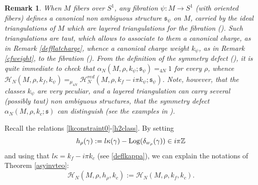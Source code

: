 \documentclass[11pt]{amsart}
\newtheorem{remark}[teo]{Remark}
\newcommand{\mz}{\mathbb{Z}}
\newcommand{\Log}{{\rm Log}}
\newcommand{\Hh}{{\mathcal H}}
\newcommand{\ra}{\rightarrow}
\begin{document}
{\begin{remark}\label{NAdefectmars25} {\rm When $M$ fibers over $S^1$, {\it any} fibration $\psi\colon M\ra S^1$ (with oriented fibers) defines a canonical non ambiguous structure $\mathfrak{s}_\psi$ on $M$, carried by the ideal triangulations of $M$ which are layered triangulations for the fibration (\cite[Prop. 6.3(1)]{NA}). Such triangulations are taut, which allows to associate to them a canonical charge, as in Remark \ref{defflatcharge}, whence a canonical charge weight $k_\psi$, as in Remark \ref{cfweight}, to the fibration (\cite[Prop. 4.3(2) and 4.8(2)]{NA}).  From the definition of the symmetry defect (\cite[page 808]{NA}), it is quite immediate to check that $\alpha_N(M,\rho,k_\psi;\mathfrak{s}_\psi)=_{4N} 1$ for every $\rho$, whence $\Hh_N(M,\rho,k_f,k_\psi) =_{\mu_{4N}} \Hh_N^{red}(M,\rho,k_f-i\pi k_\psi;\mathfrak{s}_\psi)$. Note, however, that the classes $k_\psi$ are very peculiar, and a layered triangulation can carry several (possibly taut) non ambiguous structures, that the symmetry defect $\alpha_N(M,\rho,k_c;\mathfrak{s})$ can distinguish (see the examples in \cite[Section 9]{NA}).} 
\end{remark}

Recall the relations \eqref{lkconstraint0}-\eqref{h2class}. By setting 
\begin{equation}\label{dconstraintclass} h_\rho(\gamma) := l\kappa(\gamma)-\Log(\delta_{w_\rho}(\gamma)) \in i\pi\mz
\end{equation}
and using that $l\kappa = k_f-i\pi k_c$ (see \eqref{deflkappa}), we can explain the notations of Theorem \ref{asyinvteo}:
\begin{equation}\label{HNdefh}
	\Hh_{N}(M,\rho,h_\rho,k_c) := \Hh_N(M,\rho,k_f,k_c).
\end{equation}

}
\end{document}
